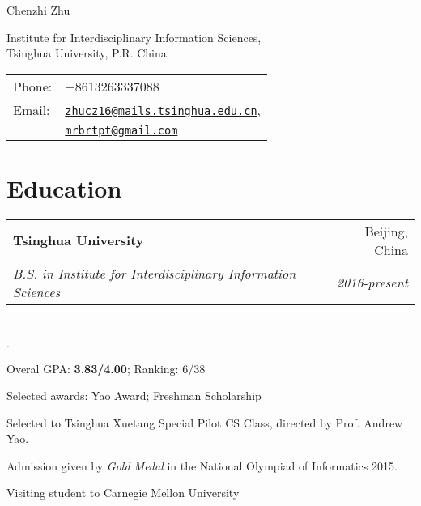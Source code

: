 \documentclass[letterpaper]{article}
\makeatletter
\def\name{Chenzhi Zhu}
\renewenvironment{itemize}{
  \begin{list}{}{
    \setlength{\leftmargin}{1.5em}
  }
}{
  \end{list}
}
\newenvironment{listed}{
  \begin{list}{$\cdot$}{
    \setlength{\leftmargin}{1.5em}
  }
}{
  \end{list}
}
\newcommand{\resumeSubheading}[4]{
  \vspace{-1pt}\item
    \begin{tabular*}{\linewidth}{@{\extracolsep{\fill}}lr}
      \textbf{#1} & #2 \\
      \textit{\normalsize #3} & \textit{\normalsize #4} \\
    \end{tabular*}\vspace{-5pt}
}
\makeatother
\begin{document}
{\huge \name}


\vspace{0.25in}

\begin{minipage}{0.55\linewidth}
  {Institute for Interdisciplinary Information Sciences, \\
    Tsinghua University, P.R. China}
\end{minipage}
\begin{minipage}{0.45\linewidth}
  \begin{tabular}{ll}
    Phone: & +8613263337088 \\
    Email: & \href{mailto:zhucz16@mails.tsinghua.edu.cn}{\tt zhucz16@mails.tsinghua.edu.cn}, \\
           & \href{mailto:mrbrtpt@gmail.com}{\tt mrbrtpt@gmail.com} \\
  \end{tabular}
\end{minipage}


\section*{Education}

\begin{itemize}
    \resumeSubheading{Tsinghua University}{Beijing, China}{B.S. in Institute for Interdisciplinary Information Sciences}{2016-present}\\
    \begin{listed}
	    \item Overal GPA: \textbf{3.83/4.00}; Ranking: 6/38
        \item Selected awards: Yao Award; Freshman Scholarship
        \item Selected to Tsinghua Xuetang Special Pilot CS Class, directed by Prof. Andrew Yao.
        \item Admission given by \emph{Gold Medal} in the National Olympiad of Informatics 2015.
        \item Visiting student to Carnegie Mellon University
    \end{listed}
\end{itemize}
\end{document}
